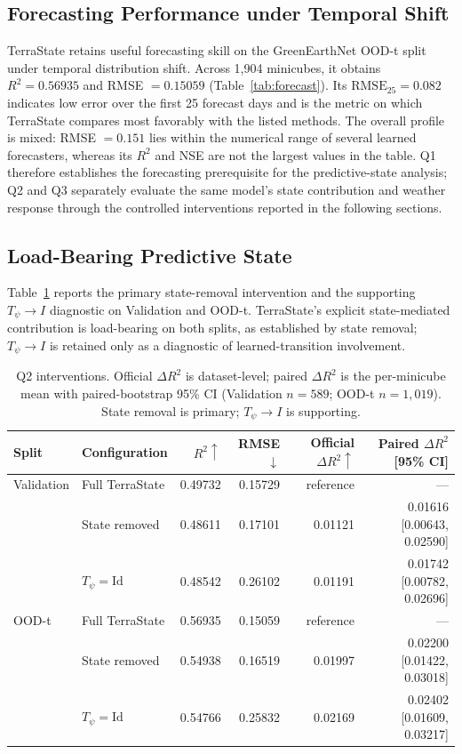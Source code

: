 \documentclass[letterpaper]{article} %
\begin{document}
\subsection{Forecasting Performance under Temporal Shift}

TerraState retains useful forecasting skill on the GreenEarthNet OOD-t split
under temporal distribution shift. Across 1,904 minicubes, it obtains
$R^2=0.56935$ and RMSE $=0.15059$ (Table~\ref{tab:forecast}). Its
$\mathrm{RMSE}_{25}=0.082$ indicates low error over the first 25 forecast days
and is the metric on which TerraState compares most favorably with the
listed methods.
The overall profile is mixed: RMSE $=0.151$ lies within the numerical range of
several learned forecasters, whereas its $R^2$ and NSE are not the largest
values in the table. Q1 therefore establishes the forecasting prerequisite for
the predictive-state analysis; Q2 and Q3 separately evaluate the same model's
state contribution and weather response through the controlled interventions
reported in the following sections.

\subsection{Load-Bearing Predictive State}

Table~\ref{tab:q2} reports the primary state-removal intervention and the
supporting $T_\psi\!\rightarrow I$ diagnostic on Validation and OOD-t.
TerraState's explicit state-mediated contribution is load-bearing on both
splits, as established by state removal; $T_\psi\!\rightarrow I$ is retained
only as a diagnostic of learned-transition involvement.

\begin{table}[t]
\centering
{\small
\setlength{\tabcolsep}{6.0pt}
\renewcommand{\arraystretch}{0.70}
\begin{tabular}{llrrrr}
\toprule
Split & Configuration & $R^2\uparrow$ & RMSE$\downarrow$ &
Official $\Delta R^2\uparrow$ & Paired $\Delta R^2$ [95\% CI]\\
\midrule
Validation & Full TerraState & 0.49732 & 0.15729 & reference & ---\\
& State removed & 0.48611 & 0.17101 & 0.01121 &
0.01616 [0.00643, 0.02590]\\
& $T_\psi=\mathrm{Id}$ & 0.48542 & 0.26102 & 0.01191 &
0.01742 [0.00782, 0.02696]\\
\midrule
OOD-t & Full TerraState & 0.56935 & 0.15059 & reference & ---\\
& State removed & 0.54938 & 0.16519 & 0.01997 &
0.02200 [0.01422, 0.03018]\\
& $T_\psi=\mathrm{Id}$ & 0.54766 & 0.25832 & 0.02169 &
0.02402 [0.01609, 0.03217]\\
\bottomrule
\end{tabular}
}
\caption{Q2 interventions. Official $\Delta R^2$ is dataset-level; paired
$\Delta R^2$ is the per-minicube mean with paired-bootstrap 95\% CI
(Validation $n=589$; OOD-t $n=1{,}019$). State removal is primary;
$T_\psi\!\rightarrow I$ is supporting.}
\label{tab:q2}
\end{table}
\end{document}
